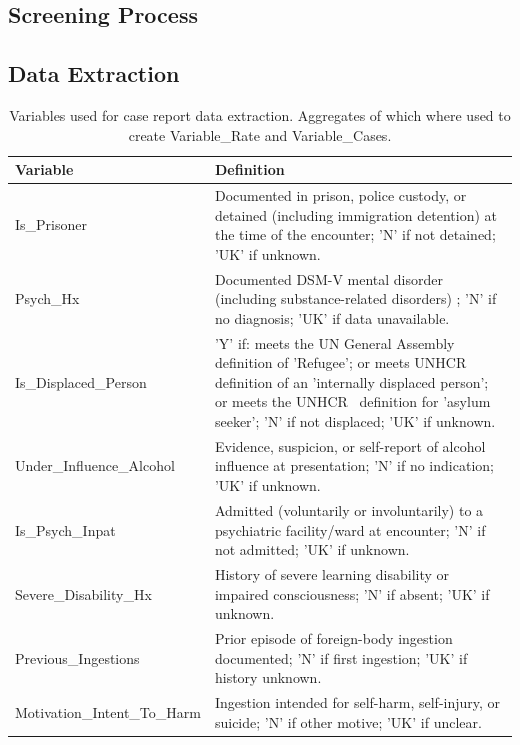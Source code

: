 \FloatBarrier
\newpage

\subsection{Screening Process}
\label{appendix:screening_results}


\subsection{Data Extraction}
\label{appendix:data_extraction}

\begin{table}[htbp]
\caption{Variables used for case report data extraction. Aggregates of which where used to create Variable\_Rate and Variable\_Cases.}
\label{tab:variables_table}
\centering
\begin{tabular}{p{4.5cm} p{10.5cm}}
\toprule
\textbf{Variable} & \textbf{Definition} \\
\midrule
Is\_Prisoner & Documented in prison, police custody, or detained (including immigration detention) at the time of the encounter; 'N' if not detained; 'UK' if unknown. \\
Psych\_Hx & Documented DSM-V mental disorder (including substance-related disorders) \cite{AmericanPsychiatricAssociation_2013}; 'N' if no diagnosis; 'UK' if data unavailable. \\
Is\_Displaced\_Person & 'Y' if: meets the UN General Assembly \cite{UNGeneralAssembly_1967} definition of 'Refugee'; or meets UNHCR~\cite{Deng_1998} definition of an 'internally displaced person'; or meets the UNHCR~\cite{UnitedNationsHighCommissionerforRefugees_2025} definition for 'asylum seeker'; 'N' if not displaced; 'UK' if unknown. \\
Under\_Influence\_Alcohol & Evidence, suspicion, or self-report of alcohol influence at presentation; 'N' if no indication; 'UK' if unknown. \\
Is\_Psych\_Inpat & Admitted (voluntarily or involuntarily) to a psychiatric facility/ward at encounter; 'N' if not admitted; 'UK' if unknown. \\
Severe\_Disability\_Hx & History of severe learning disability or impaired consciousness; 'N' if absent; 'UK' if unknown. \\
Previous\_Ingestions & Prior episode of foreign-body ingestion documented; 'N' if first ingestion; 'UK' if history unknown. \\
Motivation\_Intent\_To\_Harm & Ingestion intended for self-harm, self-injury, or suicide; 'N' if other motive; 'UK' if unclear. \\

\end{tabular}
\end{table}
